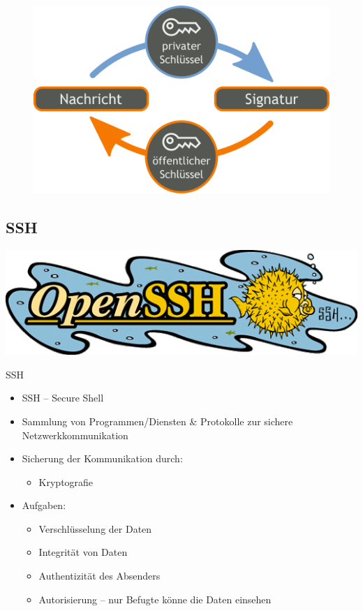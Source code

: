 \documentclass[xcolor=dvipsnames, aspectratio=169]{beamer}
\begin{document}
\begin{frame}
	\begin{figure}
	\center
	\includegraphics[scale=0.2]{digital_signature}
	\end{figure}
\end{frame}

\subsection{SSH}
\begin{frame}
\centering
\includegraphics[scale=0.5]{ssh}
\end{frame}

\begin{frame}{SSH}
\begin{itemize}
	\item SSH -- Secure Shell
	\item Sammlung von Programmen/Diensten \& Protokolle zur sichere Netzwerkkommunikation
	\item Sicherung der Kommunikation durch:
	\begin{itemize}
		\item Kryptografie
	\end{itemize}
	\item Aufgaben:
	\begin{itemize}
		\item Verschlüsselung der Daten
		\item Integrität von Daten 
		\item Authentizität des Absenders
		\item Autorisierung -- nur Befugte könne die Daten einsehen
	\end{itemize}
\end{itemize}
\end{frame}
\end{document}
